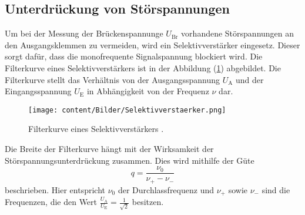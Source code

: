 \subsection{Unterdrückung von Störspannungen}
Um bei der Messung der Brückenspannunge $U_{\text{Br}}$ vorhandene Störspannungen an den Ausgangsklemmen zu vermeiden, 
wird ein Selektivverstärker eingesetz. Dieser sorgt dafür, dass die monofrequente Signalspannung blockiert wird. Die Filterkurve 
eines Selektivverstärkers ist in der Abbildung (\ref{fig:Selektivverstaerker}) abgebildet. Die Filterkurve stellt das Verhältnis von 
der Ausgangsspannung $U_{\text{A}}$ und der Eingangsspannung $U_{\text{E}}$ in Abhängigkeit von der Frequenz $\nu$ dar.
\begin{figure}[H]
    \centering
    \texttt{[image: content/Bilder/Selektivverstaerker.png]}
    \caption{Filterkurve eines Selektivverstärkers \cite{anleitungV606}.}
    \label{fig:Selektivverstaerker}
\end{figure} 
Die Breite der Filterkurve hängt mit der Wirksamkeit der Störspannungsunterdrückung zusammen.
Dies wird mithilfe der Güte 
\begin{equation}
    q = \frac{\nu _0}{\nu _{+}- \nu _{-}}
    \label{eqn:Guete}
\end{equation}
beschrieben. Hier entspricht $\nu_0$ der Durchlassfrequenz und $\nu _{+}$ sowie $\nu _{-}$ sind die Frequenzen, die den Wert $\frac{U_{\text{A}}}{U_{\text{E}}} = \frac{1}{\sqrt{2}}$ besitzen. 
